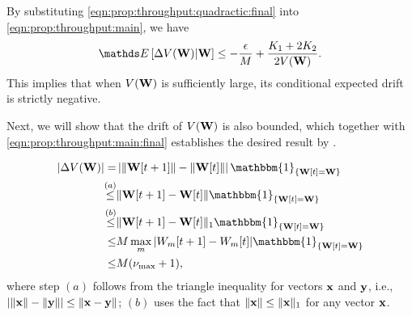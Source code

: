 \documentclass[10pt, conference, letterpaper]{IEEEtran} %
\begin{document}
By substituting \eqref{eqn:prop:throughput:quadractic:final} into \eqref{eqn:prop:throughput:main}, we have 
\begin{align}
\label{eqn:prop:throughput:main:final}
\bE\left[\Delta V(\mb{W})\middle|\mb{W}\right]\leq-\frac{\epsilon}{M}+\frac{K_1+2K_2}{2V(\mb{W})}.
\end{align}
This implies that when $V(\mathbf{W})$ is sufficiently large, its conditional expected drift is strictly negative. 

Next, we will show that the drift of $V(\mathbf{W})$ is also bounded, which together with \eqref{eqn:prop:throughput:main:final} establishes the desired result by \cite[Theorem 2.3]{haj82}.

\begin{align}
\label{eqn:prop:throughput:main:BoundDrift}
|\Delta V(\mb{W})|=&\left|\|\mb{W}[t+1]\|-\|\mb{W}[t]\|\right|\mathbbm{1}_{\{\mb{W}[t]=\mb{W}\}} \nonumber\\
\stackrel{(a)}{\leq}&\|\mb{W}[t+1]-\mb{W}[t]\|\mathbbm{1}_{\{\mb{W}[t]=\mb{W}\}} \nonumber\\
\stackrel{(b)}{\leq}&\|\mb{W}[t+1]-\mb{W}[t]\|_{1}\mathbbm{1}_{\{\mb{W}[t]=\mb{W}\}} \nonumber\\
\leq&M\max_{m}|W_m[t+1]-W_m[t]|\mathbbm{1}_{\{\mb{W}[t]=\mb{W}\}} \nonumber\\
\leq&M(\nu_{\max}+1),
\end{align}
where step $(a)$ follows from the triangle inequality for vectors $\mathbf{x}$ and $\mathbf{y}$, i.e., $|\|\mathbf{x}\|-\|\mathbf{y}\||\leq\|\mathbf{x}-\mathbf{y}\|$; $(b)$ uses the fact that $\|\mathbf{x}\|\leq\|\mathbf{x}\|_{1}$ for any vector $\mathbf{x}$.




\end{document}
